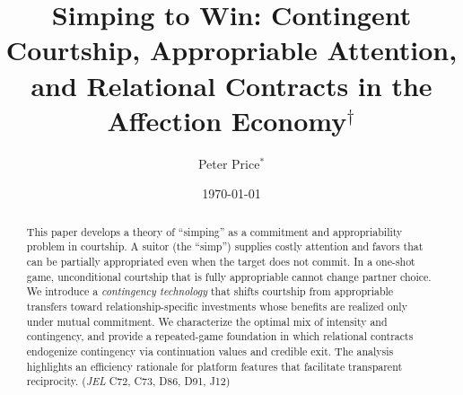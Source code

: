 \documentclass[AER]{AEA}
\begin{document}
\title{Simping to Win: Contingent Courtship, Appropriable Attention, and Relational Contracts in the Affection Economy$^\dagger$}

\author{Peter Price$^*$}
\date{\today}

\begin{abstract}
This paper develops a theory of ``simping'' as a commitment and appropriability problem in courtship. A suitor (the ``simp'') supplies costly attention and favors that can be partially appropriated even when the target does not commit. In a one-shot game, unconditional courtship that is fully appropriable cannot change partner choice. We introduce a \textit{contingency technology} that shifts courtship from appropriable transfers toward relationship-specific investments whose benefits are realized only under mutual commitment. We characterize the optimal mix of intensity and contingency, and provide a repeated-game foundation in which relational contracts endogenize contingency via continuation values and credible exit. The analysis highlights an efficiency rationale for platform features that facilitate transparent reciprocity.
\noindent (\textit{JEL} C72, C73, D86, D91, J12) \\
\end{abstract}

\maketitle

\let\thefootnote\relax{}
\let\thefootnote\relax{}

\def\thefootnote{\arabic{footnote}}
\setcounter{footnote}{0}
\end{document}
